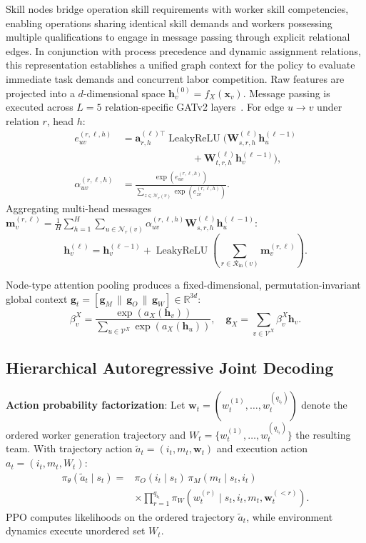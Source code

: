 \documentclass[journal,10pt]{IEEEtran}
\begin{document}
Skill nodes bridge operation skill requirements with worker skill competencies, enabling operations sharing identical skill demands and workers possessing multiple qualifications to engage in message passing through explicit relational edges. In conjunction with process precedence and dynamic assignment relations, this representation establishes a unified graph context for the policy to evaluate immediate task demands and concurrent labor competition. Raw features are projected into a $d$-dimensional space $\mathbf h_v^{(0)}=f_X(\mathbf x_v)$. Message passing is executed across $L=5$ relation-specific GATv2 layers~\cite{brody2022}. For edge $u\rightarrow v$ under relation $r$, head $h$:
\begin{align}
e_{uv}^{(r,\ell,h)} &= \mathbf a_{r,h}^{(\ell)\top}\operatorname{LeakyReLU}\Big(\mathbf W_{s,r,h}^{(\ell)}\mathbf h_u^{(\ell-1)} \nonumber \\
&\qquad\qquad\qquad\quad + \mathbf W_{t,r,h}^{(\ell)}\mathbf h_v^{(\ell-1)}\Big), \\
\alpha_{uv}^{(r,\ell,h)} &= \frac{\exp(e_{uv}^{(r,\ell,h)})}{\sum_{z\in\mathcal N_r(v)}\exp(e_{zv}^{(r,\ell,h)})}.
\end{align}
Aggregating multi-head messages $\mathbf m_v^{(r,\ell)} = \frac{1}{H}\sum_{h=1}^H\sum_{u\in\mathcal N_r(v)}\alpha_{uv}^{(r,\ell,h)}\mathbf W_{s,r,h}^{(\ell)}\mathbf h_u^{(\ell-1)}$:
\begin{equation}
\mathbf h_v^{(\ell)} = \mathbf h_v^{(\ell-1)} + \operatorname{LeakyReLU}\left(\sum_{r\in\mathcal R_{\mathrm{in}}(v)}\mathbf m_v^{(r,\ell)}\right).
\end{equation}

Node-type attention pooling produces a fixed-dimensional, permutation-invariant global context $\mathbf g_t=[\mathbf g_M \,\|\, \mathbf g_O \,\|\, \mathbf g_W]\in\mathbb R^{3d}$:
\begin{equation}
\beta_v^X = \frac{\exp(a_X(\mathbf h_v))}{\sum_{u\in\mathcal V^X}\exp(a_X(\mathbf h_u))}, \quad \mathbf g_X = \sum_{v\in\mathcal V^X}\beta_v^X\mathbf h_v.
\end{equation}

\subsection{Hierarchical Autoregressive Joint Decoding}

\textbf{Action probability factorization}:
Let $\mathbf w_t=(w_t^{(1)},\dots,w_t^{(q_{i_t})})$ denote the ordered worker generation trajectory and $W_t=\{w_t^{(1)},\dots,w_t^{(q_{i_t})}\}$ the resulting team. With trajectory action $\widetilde a_t=(i_t,m_t,\mathbf w_t)$ and execution action $a_t=(i_t,m_t,W_t)$:
\begin{equation}
\begin{aligned}
\pi_\theta(\widetilde a_t\mid s_t) ={}& \pi_O(i_t\mid s_t)\,\pi_M(m_t\mid s_t,i_t) \\
&\times \prod_{r=1}^{q_{i_t}}\pi_W\left(w_t^{(r)}\mid s_t,i_t,m_t,\mathbf w_t^{(<r)}\right).
\end{aligned}
\end{equation}
PPO computes likelihoods on the ordered trajectory $\widetilde a_t$, while environment dynamics execute unordered set $W_t$.
\end{document}
